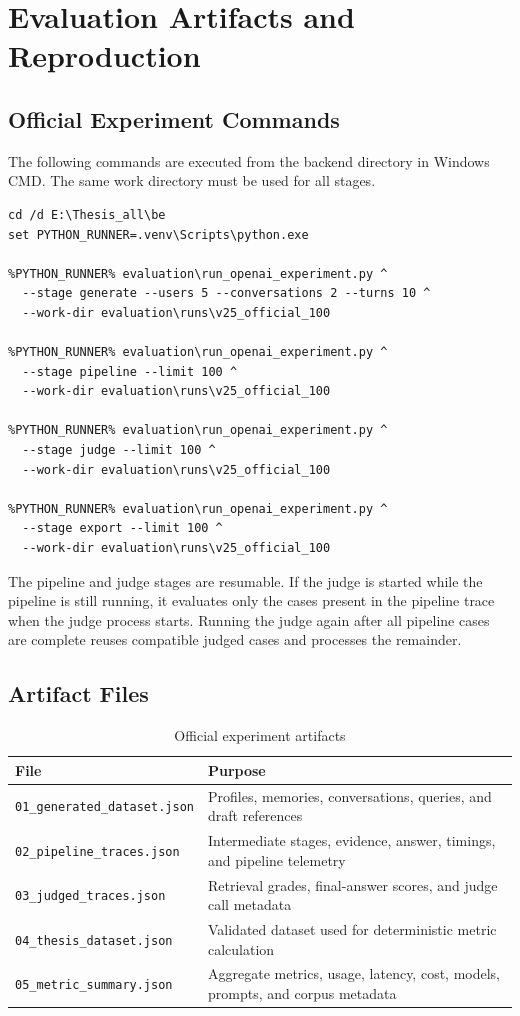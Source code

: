 \chapter{Evaluation Artifacts and Reproduction}
\label{app:commands}

\section{Official Experiment Commands}

The following commands are executed from the backend directory in Windows CMD.
The same work directory must be used for all stages.

\begin{verbatim}
cd /d E:\Thesis_all\be
set PYTHON_RUNNER=.venv\Scripts\python.exe

%PYTHON_RUNNER% evaluation\run_openai_experiment.py ^
  --stage generate --users 5 --conversations 2 --turns 10 ^
  --work-dir evaluation\runs\v25_official_100

%PYTHON_RUNNER% evaluation\run_openai_experiment.py ^
  --stage pipeline --limit 100 ^
  --work-dir evaluation\runs\v25_official_100

%PYTHON_RUNNER% evaluation\run_openai_experiment.py ^
  --stage judge --limit 100 ^
  --work-dir evaluation\runs\v25_official_100

%PYTHON_RUNNER% evaluation\run_openai_experiment.py ^
  --stage export --limit 100 ^
  --work-dir evaluation\runs\v25_official_100
\end{verbatim}

The pipeline and judge stages are resumable. If the judge is started while the
pipeline is still running, it evaluates only the cases present in the pipeline
trace when the judge process starts. Running the judge again after all pipeline
cases are complete reuses compatible judged cases and processes the remainder.

\section{Artifact Files}

\begin{table}[H]
\centering
\caption{Official experiment artifacts}
\begin{tabular}{p{} p{}}
\hline
\textbf{File} & \textbf{Purpose} \\
\hline
\texttt{01\_generated\_dataset.json} & Profiles, memories, conversations,
queries, and draft references \\
\texttt{02\_pipeline\_traces.json} & Intermediate stages, evidence, answer,
timings, and pipeline telemetry \\
\texttt{03\_judged\_traces.json} & Retrieval grades, final-answer scores, and
judge call metadata \\
\texttt{04\_thesis\_dataset.json} & Validated dataset used for deterministic
metric calculation \\
\texttt{05\_metric\_summary.json} & Aggregate metrics, usage, latency, cost,
models, prompts, and corpus metadata \\
\hline
\end{tabular}
\end{table}

